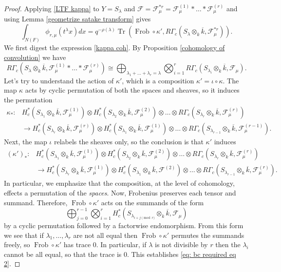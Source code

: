 \documentclass[reqno]{amsart}
\numberwithin{equation}{section}
\newcommand{\ol}[1]{\overline{#1}}
\newcommand{\Cal}[1]{\mathcal{#1}}
\newcommand{\co}{\colon}
\DeclareMathOperator{\Frob}{Frob}
\DeclareMathOperator{\Tr}{Tr}
\theoremstyle{remark}
\numberwithin{equation}{section}
\begin{document}
\begin{proof}
Applying \eqref{LTF kappa} to $Y=S_{\lambda}$ and $\Cal{F} = \Cal{F}_{\mu}^{*r} = \Cal{F}_{\mu}^{(1)} *  \ldots * \Cal{F}_{\mu}^{(r)} $ and using Lemma \ref{geometrize satake transform} gives 
\begin{equation}\label{kappa  coh}
\int_{N(F)} \phi_{r,\mu}(t^{\lambda} x) dx  = q^{-\rho(\lambda)} \Tr(\Frob \circ \kappa', R\Gamma_c(S_{\lambda} \otimes_k \ol{k},\Cal{F}_{\mu}^{*r})).
\end{equation}
We first digest the expression \eqref{kappa  coh}. By Proposition \ref{cohomology of convolution} we have 
\[
R\Gamma_c(S_{\lambda} \otimes_k \ol{k}, \Cal{F}_{\mu}^{(1)}* \ldots * \Cal{F}_{\mu}^{(r)}) \cong \bigoplus_{\lambda_1 + \ldots + \lambda_r = \lambda} \bigotimes_{i=1}^r R\Gamma_c(S_{\lambda_i} \otimes_k \ol{k}, \Cal{F}_{\mu}).
\]
Let's try to understand the action of $\kappa'$, which is a composition $\kappa' = \iota \circ \kappa$. The map $\kappa$ acts by cyclic permutation of both the spaces and sheaves, so it induces the permutation 
\begin{align*}
\kappa_* \co & H^*_c(S_{\lambda_1} \otimes_k \ol{k}, \Cal{F}_{\mu}^{(1)}) \otimes H^*_c(S_{\lambda_2} \otimes_k \ol{k}, \Cal{F}_{\mu}^{(2)}) \otimes\ldots \otimes  R\Gamma_c(S_{\lambda_r} \otimes_k \ol{k}, \Cal{F}_{\mu}^{(r)})  \\
& \rightarrow H^*_c(S_{\lambda_r} \otimes_k \ol{k}, \Cal{F}_{\mu}^{(r)}) \otimes H^*_c(S_{\lambda_1} \otimes_k \ol{k}, \Cal{F}_{\mu}^{(1)})  \otimes \ldots \otimes  R\Gamma_c(S_{\lambda_{r-1}} \otimes_k \ol{k}, \Cal{F}_{\mu}^{(r-1)}).
\end{align*}
Next, the map $\iota$ relabels the sheaves only, so the conclusion is that $\kappa'$ induces 
\begin{align*}
(\kappa')_* \co & H^*_c(S_{\lambda_1} \otimes_k \ol{k}, \Cal{F}_{\mu}^{(1)}) \otimes H^*_c(S_{\lambda_2} \otimes_k \ol{k}, \Cal{F}_{\mu}^{(2)}) \otimes\ldots \otimes  R\Gamma_c(S_{\lambda_r} \otimes_k \ol{k}, \Cal{F}_{\mu}^{(r)})  \\
& \rightarrow H^*_c(S_{\lambda_r} \otimes_k \ol{k}, \Cal{F}_{\mu}^{(1)}) \otimes H^*_c(S_{\lambda_1} \otimes_k \ol{k}, \Cal{F}^{(2)})  \otimes \ldots \otimes  R\Gamma_c(S_{\lambda_{r-1}} \otimes_k \ol{k}, \Cal{F}_{\mu}^{(r	)}).
\end{align*}
In particular, we emphasize that the composition, at the level of cohomology, effects a permutation of the \emph{spaces}. Now, Frobenius preserves each tensor and summand. Therefore, $\Frob \circ \kappa'$ acts on the summands of the form 
\[
\bigoplus_{j=0}^{r-1} \bigotimes_{i=1}^r H_c^*(S_{\lambda_{i+j \pmod{r}}} \otimes_k \ol{k}, \Cal{F}_{\mu})
\]
by a cyclic permutation followed by a factorwise endomorphism. From this form we see that if $\lambda_1,\ldots, \lambda_r$ are not all equal then $\Frob \circ \kappa'$ permutes the summands freely, so $\Frob \circ \kappa'$ has trace $0$. In particular, if $\lambda$ is not divisible by $r$ then the $\lambda_i$ cannot be all equal, so that the trace is $0$. This establishes  \eqref{eq: bc required eq 2}.


\end{proof}
\end{document}
